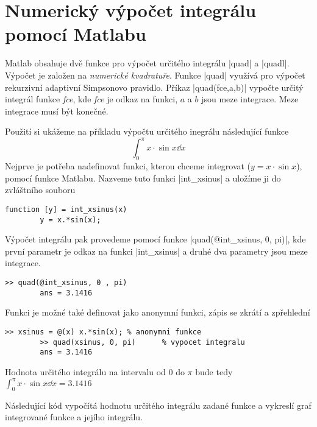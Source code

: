    

\section{Numerický výpočet integrálu pomocí Matlabu}
  Matlab obsahuje dvě funkce pro výpočet určitého integrálu |quad| a |quadl|. Výpočet je založen na
  \emph{numerické kvadratuře}. Funkce |quad| využívá pro výpočet rekurzivní adaptivní Simpsonovo
  pravidlo. Příkaz |quad(fce,a,b)| vypočte určitý integrál funkce \emph{fce}, kde \emph{fce} je
  odkaz na funkci, \(a\) a \(b\) jsou meze integrace. Meze integrace musí být konečné. 

  Použití si ukážeme na příkladu výpočtu určitého inegrálu následující funkce
  \begin{equation*}
    \int_0^\pi x\cdot\sin{x}\dd{x}
  \end{equation*}
  Nejprve je potřeba nadefinovat funkci, kterou chceme integrovat (\(y=x\cdot\sin{x}\)), pomocí
  funkce Matlabu. Nazveme tuto funkci |int\_xsinus| a uložíme ji do zvláštního souboru 
  \begin{lstlisting}[gobble=8, style=luaMatlabStyle] 
        function [y] = int_xsinus(x)
        y = x.*sin(x);
  \end{lstlisting} 
  Výpočet integrálu pak provedeme pomocí funkce |quad(@int\_xsinus, 0, pi)|, kde první parametr je
  odkaz na funkci |int\_xsinus| a druhé dva parametry jsou meze integrace.
  \begin{lstlisting}[gobble=8, style=luaMatlabStyle] 
        >> quad(@int_xsinus, 0 , pi)
        ans = 3.1416
  \end{lstlisting}  
  Funkci je možné také definovat jako anonymní funkci, zápis se zkrátí a zpřehlední
  \begin{lstlisting}[gobble=8, style=luaMatlabStyle]  
        >> xsinus = @(x) x.*sin(x); % anonymni funkce
        >> quad(xsinus, 0, pi)      % vypocet integralu
        ans = 3.1416
  \end{lstlisting}
  Hodnota určitého integrálu na intervalu od \(0\) do \(\pi\) bude tedy \(\int_0^\pi
  x\cdot\sin{x}\dd{x} =\num{3.1416}\)

  Následující kód vypočítá hodnotu určitého integrálu zadané funkce a vykreslí graf integrované
  funkce a jejího integrálu.

  

